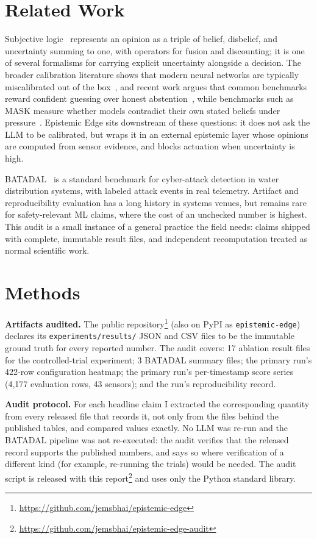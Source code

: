 \documentclass[11pt]{article}
\begin{document}
\section{Related Work}

Subjective logic~\cite{josang2016} represents an opinion as a triple of belief, disbelief, and uncertainty summing to one, with operators for fusion and discounting; it is one of several formalisms for carrying explicit uncertainty alongside a decision. The broader calibration literature shows that modern neural networks are typically miscalibrated out of the box~\cite{guo2017}, and recent work argues that common benchmarks reward confident guessing over honest abstention~\cite{kalai2025}, while benchmarks such as MASK measure whether models contradict their own stated beliefs under pressure~\cite{ren2025}. Epistemic Edge sits downstream of these questions: it does not ask the LLM to be calibrated, but wraps it in an external epistemic layer whose opinions are computed from sensor evidence, and blocks actuation when uncertainty is high.

BATADAL~\cite{taormina2018} is a standard benchmark for cyber-attack detection in water distribution systems, with labeled attack events in real telemetry. Artifact and reproducibility evaluation has a long history in systems venues, but remains rare for safety-relevant ML claims, where the cost of an unchecked number is highest. This audit is a small instance of a general practice the field needs: claims shipped with complete, immutable result files, and independent recomputation treated as normal scientific work.

\section{Methods}

\textbf{Artifacts audited.} The public repository\footnote{\url{https://github.com/jemsbhai/epistemic-edge}} (also on PyPI as \texttt{epistemic-edge}) declares its \texttt{experiments/results/} JSON and CSV files to be the immutable ground truth for every reported number. The audit covers: 17 ablation result files for the controlled-trial experiment; 3 BATADAL summary files; the primary run's 422-row configuration heatmap; the primary run's per-timestamp score series (4,177 evaluation rows, 43 sensors); and the run's reproducibility record.

\textbf{Audit protocol.} For each headline claim I extracted the corresponding quantity from every released file that records it, not only from the files behind the published tables, and compared values exactly. No LLM was re-run and the BATADAL pipeline was not re-executed: the audit verifies that the released record supports the published numbers, and says so where verification of a different kind (for example, re-running the trials) would be needed. The audit script is released with this report\footnote{\url{https://github.com/jemsbhai/epistemic-edge-audit}} and uses only the Python standard library.
\end{document}
